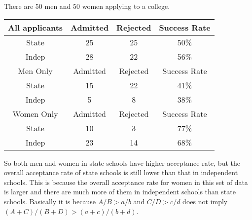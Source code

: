 \begin{example}
    There are $50$ men and $50$ women applying to a college.
    \begin{center}
        \begin{tabular}{c|c|c|c}
            \hline
            All applicants&Admitted&Rejected&Success Rate\\
            \hline
            State&25&25&50\%\\
            Indep&28&22&56\%\\
            \hline
            Men Only&Admitted&Rejected&Success Rate\\
            \hline
            State&15&22&41\%\\
            Indep&5&8&38\%\\
            \hline
            Women Only&Admitted&Rejected&Success Rate\\
            \hline
            State&10&3&77\%\\
            Indep&23&14&68\%
        \end{tabular}
    \end{center}
    So both men and women in state schools have higher acceptance rate, but the overall acceptance rate of state schools is still lower than that in independent schools.
    This is because the overall acceptance rate for women in this set of data is larger and there are much more of them in independent schools than state schools.
    Basically it is because $A/B>a/b$ and $C/D>c/d$ does not imply $(A+C)/(B+D)>(a+c)/(b+d)$.
\end{example}
